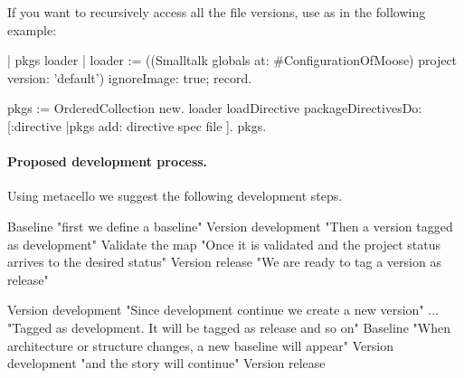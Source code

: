 \documentclass[a4paper,10pt,twoside]{book}
\begin{document}
If you want to recursively access all the file versions, use  as in the following example:

\begin{code}{}
| pkgs loader |
loader := ((Smalltalk globals at: #ConfigurationOfMoose) project version: 'default')
      ignoreImage: true;
      record.

pkgs := OrderedCollection new.
loader loadDirective packageDirectivesDo: [:directive |pkgs add: directive spec file ].
pkgs.
\end{code}




\paragraph{Proposed development process.}
Using metacello we suggest the following development steps.


\begin{code}{}
Baseline						"first we define a baseline"
Version development			"Then a version tagged as development"
Validate the map				"Once it is validated and the project status arrives to the desired status"
Version release				"We are ready to tag a version as release"	

Version development			"Since development continue we create a new version"
...							"Tagged as development. It will be tagged as release and so on"
Baseline 					"When architecture or structure changes, a new baseline will appear"
Version development			"and the story will continue"
Version release

\end{code}

\ifx\wholebook\relax\else
    
    
\end{document}
